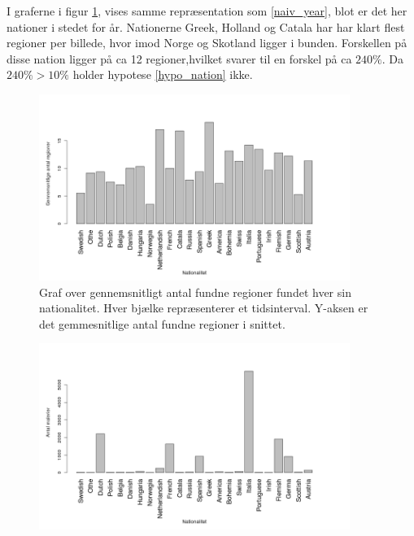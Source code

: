 {I graferne i figur \ref{naiv_nation}, vises samme repræsentation som
\ref{naiv_year}, blot er det her nationer i stedet for år. Nationerne
Greek, Holland og Catala har har klart flest regioner per billede, hvor
imod Norge og Skotland ligger i bunden. Forskellen på disse nation
ligger på ca 12 regioner,hvilket svarer til en forskel på ca $240\%$. Da
$240 \% > 10 \%$ holder hypotese \ref{hypo_nation} ikke.

\begin{figure}[!h]
	\begin{center}
		\includegraphics[angle=0,width=0.90\textwidth]{afsnit/resultater/billeder/nationcut.png}
	\end{center}
	\caption{Graf over gennemsnitligt antal fundne regioner fundet hver sin
       nationalitet. Hver bjælke repræsenterer et tidsinterval. Y-aksen
       er det gemmesnitlige antal fundne regioner i snittet.}
	\label{naiv_nation}
\end{figure}

\begin{figure}[!h]
	\begin{center}
		\includegraphics[angle=0,width=0.90\textwidth]{afsnit/resultater/billeder/nationNrImage.png}
	\end{center}
	\caption{}
	\label{naiv_nationNrImage}
\end{figure}

}
